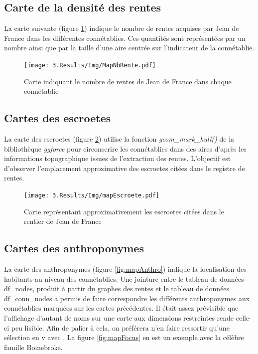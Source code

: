 \subsection{Carte de la densité des rentes }
La carte suivante (figure \ref{fig:mapNbRente}) indique le nombre de rentes acquises par Jean de France dans les différentes connétablies. Ces quantités sont représentées par un  nombre ainsi que par la taille  d'une aire centrée sur l'indicateur de la connétablie.
\begin{figure}
    \centering
    \texttt{[image: 3.Results/Img/MapNbRente.pdf]}
    \caption{Carte indiquant le nombre de rentes  de Jean de France dans chaque connétablie}
    \label{fig:mapNbRente}
\end{figure}


\subsection{Cartes des escroetes}
La carte  des escroetes (figure \ref{fig:mapEscroete})  utilise la fonction \textit{geom\_mark\_hull()} de la bibliothèque \textit{ggforce} pour circonscrire les connétablies dans des aires d'après les informations topographique issues de l'extraction des rentes. L'objectif est d'observer l'emplacement approximative des escroetes citées dans le registre de rentes.

\begin{figure}
    \centering
    \texttt{[image: 3.Results/Img/mapEscroete.pdf]}
    \caption{Carte représentant approximativement les escroetes citées dans le rentier de Jean de France}
    \label{fig:mapEscroete}
\end{figure}

\subsection{Cartes des anthroponymes}
La carte  des anthroponymes (figure \ref{fig:mapAnthro}) indique la localisation des habitants au niveau des connétablies.
Une jointure entre le tableau de données df\_nodes, produit à partir du graphes des rentes et le tableau de données df\_conn\_nodes  a permis de faire correspondre les différents anthroponymes aux connétablies marquées sur les cartes précédentes. Il était assez prévisible que l'affichage d'autant de noms  sur une carte aux dimensions restreintes rende celle-ci peu lisible. Afin de palier à cela,  on préférera n'en faire ressortir qu'une sélection en v avec . La figure \ref{fig:mapFocus} en est un exemple avec la célèbre famille Boinebroke.

